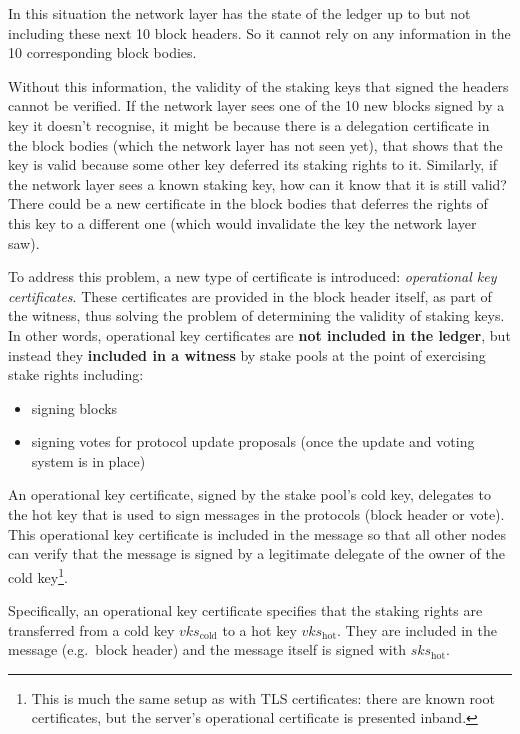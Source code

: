 \documentclass[11pt,a4paper]{article}
\begin{document}
In this situation the network layer has the state of the ledger up to
but not including these next 10 block headers. So it cannot rely on
any information in the 10 corresponding block bodies.

Without this information, the validity of the staking keys that signed
the headers cannot be verified. If the network layer sees one of the
10 new blocks signed by a key it doesn't recognise, it might be
because there is a delegation certificate in the block bodies (which
the network layer has not seen yet), that shows that the key is valid
because some other key deferred its staking rights to it. Similarly,
if the network layer sees a known staking key, how can it know that it
is still valid? There could be a new certificate in the block bodies
that deferres the rights of this key to a different one (which would
invalidate the key the network layer saw).

To address this problem, a new type of certificate is introduced:
\emph{operational key certificates}. These certificates are provided
in the block header itself, as part of the witness, thus solving the
problem of determining the validity of staking keys. In other words,
operational key certificates are \textbf{not included in
  the ledger}, but instead they \textbf{included in a witness} by
stake pools at the point of exercising stake rights including:

\begin{itemize}
\item
  signing blocks
\item signing votes for protocol update proposals (once the update and
  voting system is in place)
\end{itemize}

An operational key certificate, signed by the stake pool's cold key,
delegates to the hot key that is used to sign messages in the
protocols (block header or vote). This operational key certificate is
included in the message so that all other nodes can verify that the
message is signed by a legitimate delegate of the owner of the cold
key\footnote{This is much the same setup as with TLS certificates:
  there are known root certificates, but the server's operational
  certificate is presented inband.}.

Specifically, an operational key certificate specifies that the
staking rights are transferred from a cold key \(vks_\text{cold}\)
to a hot key \(vks_\text{hot}\).
They are included in the message (e.g.~block header) and the message
itself is signed with \(sks_\text{hot}\).
\end{document}
